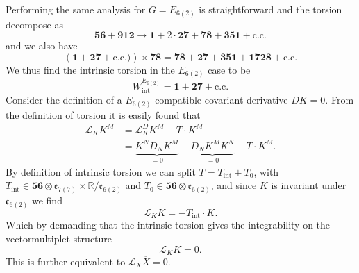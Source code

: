 Performing the same analysis for $G=E_{6(2)}$ is straightforward and the torsion decompose as
\begin{equation}
    \mathbf{56}+\mathbf{912}\to \mathbf{1}+2\cdot\mathbf{27}+\mathbf{78}+\mathbf{351}+\text{c.c.}
\end{equation}
and we also have 
\begin{equation}
    \left(\mathbf{1}+\mathbf{27}+\text{c.c.})\right)\times \mathbf{78} = \mathbf{78}+\mathbf{27}+\mathbf{351}+\mathbf{1728}+\text{c.c.}
\end{equation}
We thus find the intrinsic torsion in the $E_{6(2)}$ case to be 
\begin{equation}
    W_{\text{int}}^{E_{6(2)}} = \textbf{1}+\mathbf{27}+\text{c.c.}
\end{equation}
Consider the definition of a $E_{6(2)}$ compatible covariant derivative $DK=0$. From the definition of torsion it is easily found that 
\begin{equation}
    \begin{aligned}
    \mathscr{L}_KK^M &= \mathscr{L}^D_KK^M-T\cdot K^M\\
                    &= \underbrace{K^ND_NK^M}_{=0}-\underbrace{D_NK^MK^N}_{=0}-T\cdot K^M.
    \end{aligned}
\end{equation}
By definition of intrinsic torsion we can split $T=T_{\text{int}}+T_0$, with $T_{\text{int}}\in \mathbf{56}\otimes \mathfrak{e}_{7(7)}\times\mathbb{R}/\mathfrak{e}_{6(2)}$ and $T_0\in \mathbf{56}\otimes\mathfrak{e}_{6(2)}$, and since $K$ is invariant under $\mathfrak{e}_{6(2)}$ we find 
\begin{equation}
    \mathscr{L}_K K = -T_{\text{int}}\cdot K.
\end{equation}
Which by demanding that the intrinsic torsion gives the integrability on the vectormultiplet structure 
\begin{equation}\label{eq:IntegrabilityVectorMultiplet}
    \mathscr{L}_K K = 0.
\end{equation}
This is further equivalent to $\mathscr{L}_X\overbar{X}=0$. 

